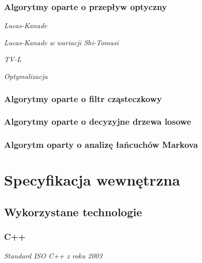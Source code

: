 \subsection{Algorytmy oparte o przepływ optyczny}\label{Subsection_OpticalFlow}

\textit{Lucas-Kanade}

\textit{Lucas-Kanade w wariacji Shi-Tomasi}

\textit{TV-L}

\textit{Optymalizacja}

\cite{LucasKanadeTracker81}
\cite{GoodFeaturesToTrack94}
\cite{TVL107}
\cite{OpticalFlowNonPriori05}

\subsection{Algorytmy oparte o filtr cząsteczkowy}\label{Subsection_ParticleFilter}
\cite{ParticleFilter05}
\cite{FingertipParticleFilter11}

\subsection{Algorytmy oparte o decyzyjne drzewa losowe}\label{Subsection_RandomizedTrees}
\cite{RandomizedTrees06}
\cite{TwoStageRandomizedTrees11}

\subsection{Algorytm oparty o analizę łańcuchów Markova}\label{Subsection_Vitterbi}
\cite{HandTrackingVitterbi05}

\chapter{Specyfikacja wewnętrzna}\label{Chapter_SpecyfikacjaWewnetrzna}

\section{Wykorzystane technologie}\label{Section_Technologie}

\subsection{C++}\label{Subsection_Cpp}

\textit{Standard ISO C++ z roku 2003}\cite{CppStroustrup}\cite{EffectiveCpp}\cite{MoreEffectiveCpp}

